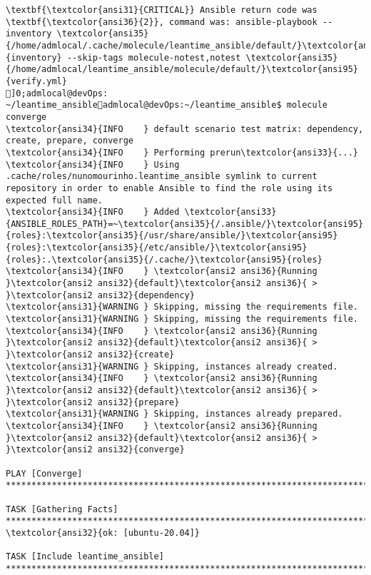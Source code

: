 \documentclass{scrartcl}
\begin{document}
\begin{Verbatim}
\textbf{\textcolor{ansi31}{CRITICAL}} Ansible return code was \textbf{\textcolor{ansi36}{2}}, command was: ansible-playbook --inventory \textcolor{ansi35}{/home/admlocal/.cache/molecule/leantime_ansible/default/}\textcolor{ansi95}{inventory} --skip-tags molecule-notest,notest \textcolor{ansi35}{/home/admlocal/leantime_ansible/molecule/default/}\textcolor{ansi95}{verify.yml}
]0;admlocal@devOps: ~/leantime_ansibleadmlocal@devOps:~/leantime_ansible$ molecule converge
\textcolor{ansi34}{INFO    } default scenario test matrix: dependency, create, prepare, converge
\textcolor{ansi34}{INFO    } Performing prerun\textcolor{ansi33}{...}
\textcolor{ansi34}{INFO    } Using .cache/roles/nunomourinho.leantime_ansible symlink to current repository in order to enable Ansible to find the role using its expected full name.
\textcolor{ansi34}{INFO    } Added \textcolor{ansi33}{ANSIBLE_ROLES_PATH}=~\textcolor{ansi35}{/.ansible/}\textcolor{ansi95}{roles}:\textcolor{ansi35}{/usr/share/ansible/}\textcolor{ansi95}{roles}:\textcolor{ansi35}{/etc/ansible/}\textcolor{ansi95}{roles}:.\textcolor{ansi35}{/.cache/}\textcolor{ansi95}{roles}
\textcolor{ansi34}{INFO    } \textcolor{ansi2 ansi36}{Running }\textcolor{ansi2 ansi32}{default}\textcolor{ansi2 ansi36}{ > }\textcolor{ansi2 ansi32}{dependency}
\textcolor{ansi31}{WARNING } Skipping, missing the requirements file.
\textcolor{ansi31}{WARNING } Skipping, missing the requirements file.
\textcolor{ansi34}{INFO    } \textcolor{ansi2 ansi36}{Running }\textcolor{ansi2 ansi32}{default}\textcolor{ansi2 ansi36}{ > }\textcolor{ansi2 ansi32}{create}
\textcolor{ansi31}{WARNING } Skipping, instances already created.
\textcolor{ansi34}{INFO    } \textcolor{ansi2 ansi36}{Running }\textcolor{ansi2 ansi32}{default}\textcolor{ansi2 ansi36}{ > }\textcolor{ansi2 ansi32}{prepare}
\textcolor{ansi31}{WARNING } Skipping, instances already prepared.
\textcolor{ansi34}{INFO    } \textcolor{ansi2 ansi36}{Running }\textcolor{ansi2 ansi32}{default}\textcolor{ansi2 ansi36}{ > }\textcolor{ansi2 ansi32}{converge}

PLAY [Converge] **************************************************************************************************************************

TASK [Gathering Facts] *******************************************************************************************************************
\textcolor{ansi32}{ok: [ubuntu-20.04]}

TASK [Include leantime_ansible] **********************************************************************************************************


\end{Verbatim}
\end{document}

